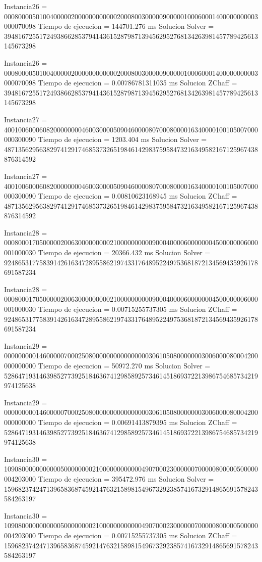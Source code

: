 Instancia26 = 000800005010040000020000000000002000800300000900000100060001400000000003000070098
Tiempo de ejecucion = 144701.276 ms
Solucion Solver = 394816725517249386628537941436152879871394562952768134263981457789425613145673298

Instancia26 = 000800005010040000020000000000002000800300000900000100060001400000000003000070098
Tiempo de ejecucion = 0.00786781311035 ms
Solucion ZChaff = 394816725517249386628537941436152879871394562952768134263981457789425613145673298

Instancia27 = 400100600060820000000046003000050904600008070008000016340000100105007000000300090
Tiempo de ejecucion = 1203.404 ms
Solucion Solver = 487135629563829741291746853732651984614298375958473216349582167125967438876314592

Instancia27 = 400100600060820000000046003000050904600008070008000016340000100105007000000300090
Tiempo de ejecucion = 0.00810623168945 ms
Solucion ZChaff = 487135629563829741291746853732651984614298375958473216349582167125967438876314592

Instancia28 = 000800017050000020063000000000210000000000900040000600000004500000006000001000030
Tiempo de ejecucion = 20366.432 ms
Solucion Solver = 924865317758391426163472895586219743317648952249753681872134569435926178691587234

Instancia28 = 000800017050000020063000000000210000000000900040000600000004500000006000001000030
Tiempo de ejecucion = 0.00715255737305 ms
Solucion ZChaff = 924865317758391426163472895586219743317648952249753681872134569435926178691587234

Instancia29 = 000000000146000007000250800000000000000003061050800000003006000080004200000000000
Tiempo de ejecucion = 50972.270 ms
Solucion Solver = 528647193146398527739251846367412985892573461451869372213986754685734219974125638

Instancia29 = 000000000146000007000250800000000000000003061050800000003006000080004200000000000
Tiempo de ejecucion = 0.00691413879395 ms
Solucion ZChaff = 528647193146398527739251846367412985892573461451869372213986754685734219974125638

Instancia30 = 109080000000000050000000021000000000000490700023000000700000800000500000004203000
Tiempo de ejecucion = 395472.976 ms
Solucion Solver = 159682374247139658368745921476321589815496732923857416732914865691578243584263197

Instancia30 = 109080000000000050000000021000000000000490700023000000700000800000500000004203000
Tiempo de ejecucion = 0.00715255737305 ms
Solucion ZChaff = 159682374247139658368745921476321589815496732923857416732914865691578243584263197


